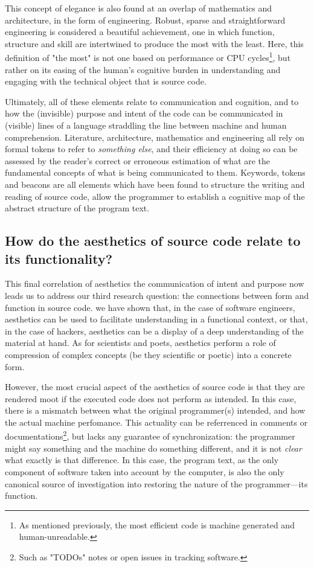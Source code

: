 This concept of elegance is also found at an overlap of mathematics and architecture, in the form of engineering. Robust, sparse and straightforward engineering is considered a beautiful achievement, one in which function, structure and skill are intertwined to produce the most with the least. Here, this definition of "the most" is not one based on performance or CPU cycles\footnote{As mentioned previously, the most efficient code is machine generated and human-unreadable.}, but rather on its easing of the human's cognitive burden in understanding and engaging with the technical object that is source code.

Ultimately, all of these elements relate to communication and cognition, and to how the (invisible) purpose and intent of the code can be communicated in (visible) lines of a language straddling the line between machine and human comprehension. Literature, architecture, mathematics and engineering all rely on formal tokens to refer to \emph{something else}, and their efficiency at doing so can be assessed by the reader's correct or erroneous estimation of what are the fundamental concepts of what is being communicated to them. Keywords, tokens and beacons are all elements which have been found to structure the writing and reading of source code, allow the programmer to establish a cognitive map of the abstract structure of the program text.

\subsection{How do the aesthetics of source code relate to its functionality?}
\label{subsec:conclusion-rq-3}

This final correlation of aesthetics the communication of intent and purpose now leads us to address our third research question: the connections between form and function in source code. we have shown that, in the case of software engineers, aesthetics can be used to facilitate understanding in a functional context, or that, in the case of hackers, aesthetics can be a display of a deep understanding of the material at hand. As for scientists and poets, aesthetics perform a role of compression of complex concepts (be they scientific or poetic) into a concrete form.

However, the most crucial aspect of the aesthetics of source code is that they are rendered moot if the executed code does not perform as intended. In this case, there is a mismatch between what the original programmer(s) intended, and how the actual machine perfomance. This actuality can be referrenced in comments or documentations\footnote{Such as "TODOs" notes or open issues in tracking software.}, but lacks any guarantee of synchronization: the programmer might say something and the machine do something different, and it is not \emph{clear} what exactly is that difference. In this case, the program text, as the only component of software taken into account by the computer, is also the only canonical source of investigation into restoring the nature of the programmer—its function.


